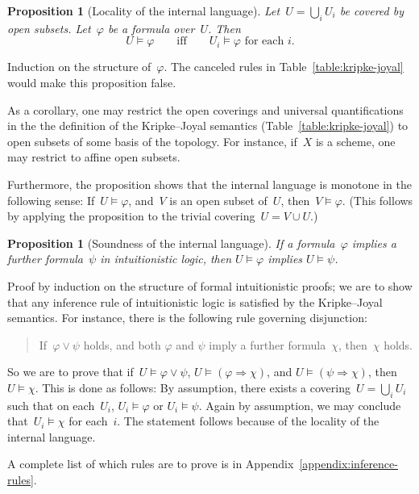\documentclass[10pt,reqno,a4paper]{amsbook}
\makeatletter
\theoremstyle{definition}
\theoremstyle{plain}
\newtheorem{prop}[defn]{Proposition}
\theoremstyle{remark}
\newcommand{\?}{\,{:}\,}
\renewcommand{\_}{\mathpunct{.}\,}
\renewenvironment{proof}[1][\proofname]{\par
  \pushQED{\qed}%
  \normalfont \topsep6\p@\@plus6\p@\relax
  \trivlist
  \item[\hskip\labelsep
        \itshape
    #1\@addpunct{.}]\ignorespaces
}{%
  \popQED\endtrivlist\@endpefalse
}
\makeatother
\begin{document}
\begin{prop}[Locality of the internal language]
\label{prop:locality-of-the-internal-language}
Let~$U = \bigcup_i U_i$ be covered by open subsets. Let~$\varphi$
be a formula over~$U$. Then
\[ U \models \varphi \qquad\text{iff}\qquad
  \text{$U_i \models \varphi$ for each $i$}. \]
\end{prop}
\begin{proof}Induction on the structure of~$\varphi$. The canceled
rules in Table~\ref{table:kripke-joyal} would make this proposition false.\end{proof}

As a corollary, one may restrict the open coverings and universal
quantifications in the the definition of the Kripke--Joyal semantics
(Table~\ref{table:kripke-joyal}) to open subsets of some basis of the topology.
For instance, if~$X$ is a scheme, one may restrict to affine open subsets.

Furthermore, the proposition shows that the internal language is monotone in
the following sense: If~$U \models \varphi$, and~$V$ is an open subset of~$U$,
then~$V \models \varphi$. (This follows by applying the proposition to the
trivial covering~$U = V \cup U$.)

\begin{prop}[Soundness of the internal language]
\label{prop:soundness-of-the-internal-language}
If a formula~$\varphi$ implies a further formula~$\psi$ in intuitionistic logic, then
$U \models \varphi$ implies $U \models \psi$.
\end{prop}
\begin{proof}
Proof by induction on the structure of formal intuitionistic proofs; we are to
show that any inference rule of intuitionistic logic is satisfied by the
Kripke--Joyal semantics. For instance, there is the following rule governing
disjunction:
\begin{quote}
If~$\varphi \vee \psi$ holds, and both $\varphi$ and $\psi$ imply a further
formula~$\chi$, then~$\chi$ holds.
\end{quote}
So we are to prove that if~$U \models \varphi \vee \psi$, $U \models (\varphi
\Rightarrow \chi)$, and $U \models (\psi \Rightarrow \chi)$, then $U \models \chi$.
This is done as follows: By assumption, there exists a covering~$U = \bigcup_i
U_i$ such that on each~$U_i$, $U_i \models \varphi$ or $U_i \models \psi$.
Again by assumption, we may conclude that~$U_i \models \chi$ for each~$i$. The statement
follows because of the locality of the internal language.

A complete list of which rules are to prove is
in Appendix~\ref{appendix:inference-rules}.
\end{proof}
\end{document}
